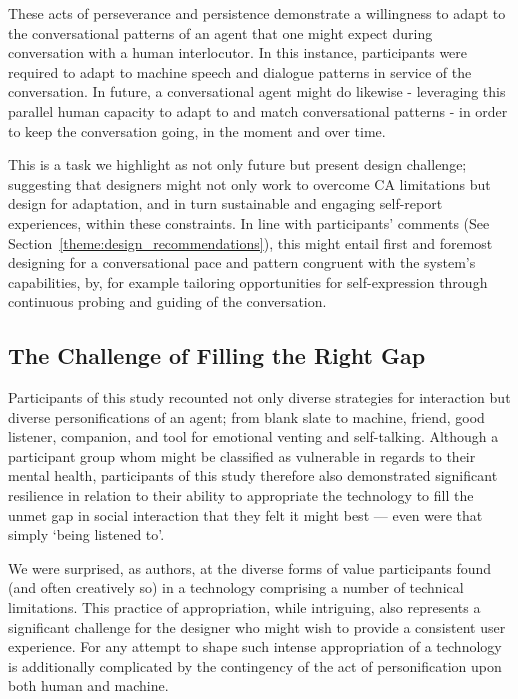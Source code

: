         These acts of perseverance and persistence demonstrate a willingness to adapt to the conversational patterns of an agent that one might expect during conversation with a human interlocutor. In this instance, participants were required to adapt to machine speech and dialogue patterns in service of the conversation. In future, a conversational agent might do likewise - leveraging this parallel human capacity to adapt to and match conversational patterns - in order to keep the conversation going, in the moment and over time. 
        
        This is a task we highlight as not only future but present design challenge; suggesting that designers might not only work to overcome \ac{CA} limitations but design for adaptation, and in turn sustainable and engaging self-report experiences, within these constraints. In line with participants' comments (See Section~\ref{theme:design_recommendations}), this might entail first and foremost designing for a conversational pace and pattern congruent with the system's capabilities, by, for example tailoring opportunities for self-expression through continuous probing and guiding of the conversation.
        
    \subsection{The Challenge of Filling the Right Gap} %
    
        Participants of this study recounted not only diverse strategies for interaction but diverse personifications of an agent; from blank slate to machine, friend, good listener, companion, and tool for emotional venting and self-talking. Although a participant group whom might be classified as vulnerable in regards to their mental health, participants of this study therefore also demonstrated significant resilience in relation to their ability to appropriate the technology to fill the unmet gap in social interaction that they felt it might best --- even were that simply `being listened to'. 
        
        We were surprised, as authors, at the diverse forms of value participants found (and often creatively so) in a technology comprising a number of technical limitations. This practice of appropriation, while intriguing, also represents a significant challenge for the designer who might wish to provide a consistent user experience. For any attempt to shape such intense appropriation of a technology is additionally complicated by the contingency of the act of personification upon both human and machine.
        
